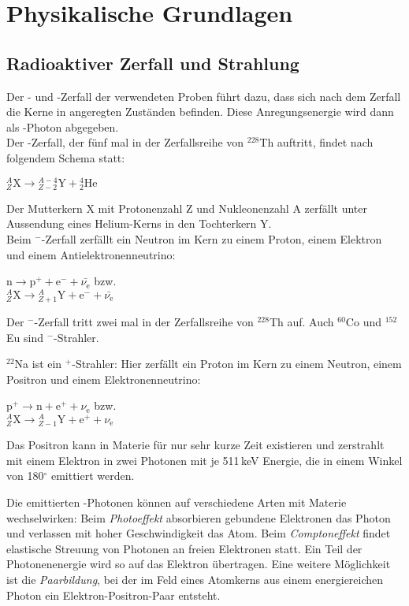 \section{Physikalische Grundlagen}
\subsection{Radioaktiver Zerfall und Strahlung}

Der \textalpha- und \textbeta-Zerfall der verwendeten Proben führt dazu,
dass sich nach dem Zerfall die Kerne in angeregten Zuständen befinden.
Diese Anregungsenergie wird dann als \textgamma-Photon abgegeben.\\[\baselineskip]
Der \textalpha-Zerfall, der fünf mal in der Zerfallsreihe von ${}^{228}$Th auftritt,
findet nach folgendem Schema statt:
\begin{center}
${}^{A}_{Z}\text{X} \rightarrow {}^{A-4}_{Z-2}\text{Y} + {}^{4}_{2}\text{He}$
\end{center}
Der Mutterkern X mit Protonenzahl Z und Nukleonenzahl A zerfällt unter Aussendung eines Helium-Kerns
in den Tochterkern Y.\\[\baselineskip]
Beim \textbeta$^-$-Zerfall zerfällt ein Neutron im Kern zu einem Proton, einem Elektron und einem
Antielektronenneutrino:
\begin{center}
$\text{n} \rightarrow \text{p}^+ + \text{e}^- +\bar{\nu_{\text{e}}}$ bzw.\\[0.15cm]
${}^{A}_{Z}\text{X} \rightarrow {}^{A}_{Z+1}\text{Y} + \text{e}^- + \bar{\nu_{\text{e}}}$
\end{center}

Der \textbeta$^-$-Zerfall tritt zwei mal in der Zerfallsreihe von ${}^{228}$Th auf.
Auch ${}^{60}$Co und ${}^{152}$Eu sind \textbeta$^-$-Strahler.

${}^{22}$Na ist ein \textbeta$^+$-Strahler:
Hier zerfällt ein Proton im Kern zu einem Neutron, einem Positron und einem
Elektronenneutrino:
\begin{center}
$\text{p}^+ \rightarrow \text{n} + \text{e}^+ +\nu_{\text{e}}$ bzw.\\[0.15cm]
${}^{A}_{Z}\text{X} \rightarrow {}^{A}_{Z-1}\text{Y} + \text{e}^+ + \nu_{\text{e}}$
\end{center}

Das Positron kann in Materie für nur sehr kurze Zeit existieren und zerstrahlt mit einem Elektron
in zwei Photonen mit je 511\,keV Energie, die in einem Winkel von 180$^\circ$ emittiert werden.

Die emittierten \textgamma-Photonen können auf verschiedene Arten mit Materie wechselwirken:
Beim \emph{Photoeffekt} absorbieren gebundene Elektronen das Photon und verlassen mit hoher Geschwindigkeit das Atom.
Beim \emph{Comptoneffekt} findet elastische Streuung von Photonen an freien Elektronen statt.
Ein Teil der Photonenenergie wird so auf das Elektron übertragen.
Eine weitere Möglichkeit ist die \emph{Paarbildung}, bei der im Feld eines Atomkerns aus einem energiereichen
Photon ein Elektron-Positron-Paar entsteht.



